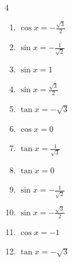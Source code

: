 \begin{multicols}{4}
\begin{enumerate}
  \item $\displaystyle \cos{x}  = -\frac{\sqrt{3}}{2}$


  \item $\displaystyle \sin{x}  = -\frac{1}{\sqrt{2}}$


  \item $\displaystyle \sin{x}  = 1$


  \item $\displaystyle \sin{x}  = \frac{\sqrt{3}}{2}$


  \item $\displaystyle \tan{x}  = -\sqrt{3}$


  \item $\displaystyle \cos{x}  = 0$


  \item $\displaystyle \tan{x}  = \frac{1}{\sqrt{3}}$


  \item $\displaystyle \tan{x}  = 0$


  \item $\displaystyle \sin{x}  = -\frac{1}{\sqrt{2}}$


  \item $\displaystyle \sin{x}  = -\frac{\sqrt{3}}{2}$


  \item $\displaystyle \cos{x}  = -1$


  \item $\displaystyle \tan{x}  = -\sqrt{3}$


\end{enumerate}
\end{multicols}
